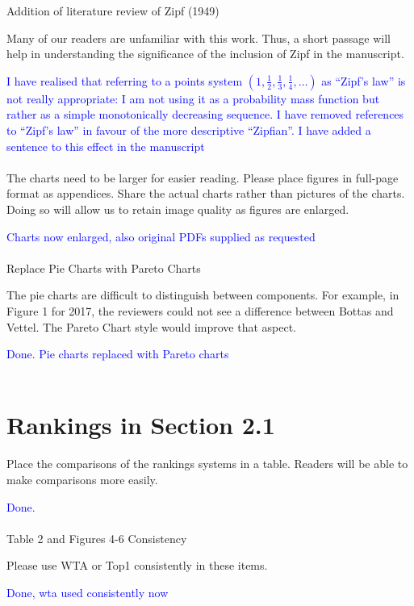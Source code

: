 \documentclass[12pt]{article}
\begin{document}
Addition of literature review of Zipf (1949)

Many of our readers are unfamiliar with this work.  Thus, a short
passage will help in understanding the significance of the inclusion
of Zipf in the manuscript.

\textcolor{blue}{I have realised that referring to a points system
  $\left(1,\frac{1}{2},\frac{1}{3},\frac{1}{4},\ldots\right)$ as
  ``Zipf's law'' is not really appropriate: I am not using it as a
  probability mass function but rather as a simple monotonically
  decreasing sequence.  I have removed references to ``Zipf's law'' in
  favour of the more descriptive ``Zipfian''.  I have added a sentence
  to this effect in the manuscript}\\ \\

The charts need to be larger for easier reading.  Please place figures
in full-page format as appendices.  Share the actual charts rather
than pictures of the charts.  Doing so will allow us to retain image
quality as figures are enlarged.

\textcolor{blue}{Charts now enlarged, also original PDFs supplied as
  requested}\\ \\

Replace Pie Charts with Pareto Charts

The pie charts are difficult to distinguish between components. For
example, in Figure 1 for 2017, the reviewers could not see a
difference between Bottas and Vettel.  The Pareto Chart style would
improve that aspect.

\textcolor{blue}{Done.  Pie charts replaced with Pareto charts}\\ \\


\section*{Rankings in Section 2.1}

Place the comparisons of the rankings systems in a table.  Readers will
be able to make comparisons more easily.

\textcolor{blue}{Done.}\\ \\

Table 2 and Figures 4-6 Consistency

Please use WTA or Top1 consistently in these items.

\textcolor{blue}{Done, wta used consistently now}\\ \\
\end{document}
